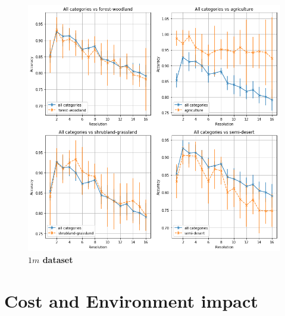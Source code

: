 \begin{figure}[h!]
	\centering
	\includegraphics[width=\textwidth]{Figures/results_1m_by_category.png}
	\captionsetup{width=1\linewidth}
	\caption{\textbf{$1m$ dataset}}
	\label{fig:acc_1m_byl_cat}
\end{figure}



\section{Cost and Environment impact}
